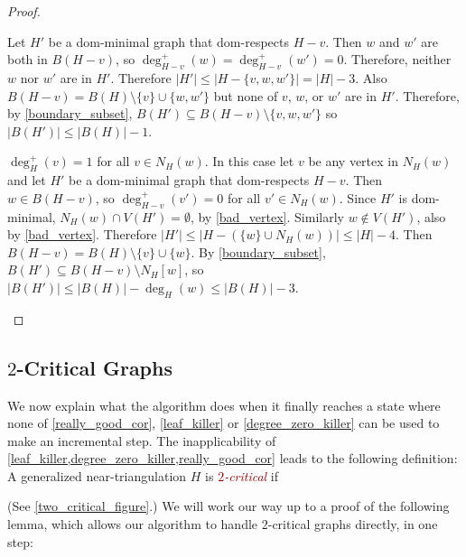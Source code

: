 \documentclass{article}
\newcommand{\defin}[1]{\emph{\textcolor{Maroon}{#1}}}
\theoremstyle{definition}
\begin{document}
\begin{proof}
\begin{compactenum}[(a)]
    Let $H'$ be a dom-minimal graph that dom-respects $H-v$. Then $w$ and $w'$ are both in $B(H-v)$, so $\deg^+_{H-v}(w)=\deg^+_{H-v}(w')=0$. Therefore, neither $w$ nor $w'$ are in $H'$. Therefore $|H'|\le |H-\{v,w,w'\}|=|H|-3$.  Also $B(H-v)=B(H)\setminus\{v\}\cup\{w,w'\}$ but none of $v$, $w$, or $w'$ are in $H'$.  Therefore, by \cref{boundary_subset}, $B(H')\subseteq B(H-v)\setminus\{v,w,w'\}$ so $|B(H')|\le |B(H)|-1$.

    \item $\deg^+_H(v)=1$ for all $v\in N_H(w)$.  In this case let $v$ be any vertex in $N_H(w)$ and let $H'$ be a dom-minimal graph that dom-respects $H-v$.  Then $w\in B(H-v)$, so $\deg^+_{H-v}(v')=0$ for all $v'\in N_H(w)$. Since $H'$ is dom-minimal, $N_H(w)\cap V(H')=\emptyset$, by \cref{bad_vertex}.  Similarly $w\not\in V(H')$, also by \cref{bad_vertex}. Therefore $|H'|\le |H-(\{w\}\cup N_H(w))| \le |H|-4$. Then $B(H-v)=B(H)\setminus\{v\}\cup\{w\}$.
    By \cref{boundary_subset}, $B(H')\subseteq B(H-v)\setminus N_H[w]$, so $|B(H')|\le |B(H)|-\deg_H(w) \le |B(H)|-3$. \qedhere
  \end{compactenum}
\end{proof}



\subsection{$2$-Critical Graphs}
\label{two_critical_section}

We now explain what the algorithm does when it finally reaches a state where  none of \cref{really_good_cor}, \cref{leaf_killer} or \cref{degree_zero_killer} can be used to make an incremental step.  The inapplicability of \cref{leaf_killer,degree_zero_killer,really_good_cor} leads to the following definition:
A generalized near-triangulation $H$ is \defin{$2$-critical} if
(See \cref{two_critical_figure}.) We will work our way up to a proof of the following lemma, which allows our algorithm to handle $2$-critical graphs directly, in one step:
\end{document}
